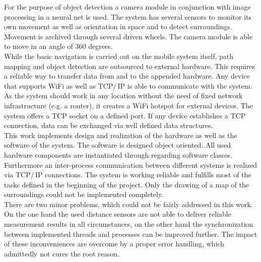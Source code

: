 \documentclass[a4paper,12pt,oneside]{article}
\begin{document}
For the purpose of object detection a camera module in conjunction with image processing in a neural net is used. The system has several sensors to monitor its own movement as well as orientation in space and to detect surroundings. Movement is archived through several driven wheels. The camera module is able to move in an angle of 360 degrees.\\

While the basic navigation is carried out on the mobile system itself, path mapping and object detection are outsourced to external hardware. This requires a reliable way to transfer data from and to the appended hardware. Any device that supports WiFi as well as TCP/\,IP is able to communicate with the system. As the system should work in any location without the need of fixed network infrastructure (e.g. a router), it creates a WiFi hotspot for external devices. The system offers a TCP socket on a defined port. If any device establishes a TCP connection, data can be exchanged via well defined data structures.\\

This work implements design and realization of the hardware as well as the software of the system. The software is designed object oriented. All used hardware components are instantiated through regarding software classes. Furthermore an inter-process communication between different systems is realized via TCP/\,IP connections. The system is working reliable and fulfills most of the tasks defined in the beginning of the project. Only the drawing of a map of the surroundings could not be implemented completely.\\

There are two minor problems, which could not be fairly addressed in this work. On the one hand the used distance sensors are not able to deliver reliable measurement results in all circumstances, on the other hand the synchronization between implemented threads and processes can be improved further. The impact of these inconveniences are overcome by a proper error handling, which admittedly not cures the root reason.

\newpage
\cleardoublepage
\pagestyle{TOC}
\tableofcontents

\newpage
\listoffigures

\newpage
\listoftables





%


\end{document}
